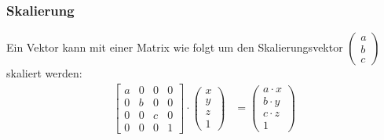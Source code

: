 \documentclass[titlepage, 11pt, a4paper, ngerman]{article}
\begin{document}
\subsubsection{Skalierung}
Ein Vektor kann mit einer Matrix wie folgt um den Skalierungsvektor $\begin{pmatrix}
    a \\
    b \\
    c
    \end{pmatrix}$ skaliert werden:
\begin{align*}
    \begin{bmatrix}
    a & 0 & 0 & 0 \\
    0 & b & 0 & 0 \\
    0 & 0 & c & 0 \\
    0 & 0 & 0 & 1
    \end{bmatrix} \cdot
    \begin{pmatrix}
    x \\ y \\ z \\ 1
    \end{pmatrix} &=
    \begin{pmatrix}
    a \cdot x \\
    b \cdot y \\
    c \cdot z \\
    1
    \end{pmatrix}
\end{align*}
\end{document}
